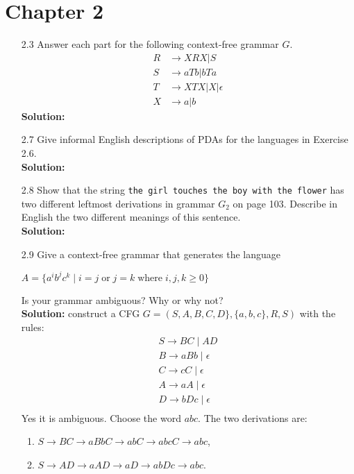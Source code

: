 \chapter*{Chapter 2}

\begin{enumerate}
\item[2.3]Answer each part for the following context-free grammar $G$.
\begin{align*}
R &\rightarrow XRX | S \\
S &\rightarrow aTb | bTa \\
T &\rightarrow XTX | X | \epsilon \\
X &\rightarrow a | b
\end{align*}
\textbf{Solution:} \alreadyanswered

\item[2.7]Give informal English descriptions of PDAs for the languages in Exercise 2.6.
\\
\textbf{Solution:} \alreadyanswered

\item[2.8]Show that the string \verb|the girl touches the boy with the flower| has two different leftmost derivations in grammar $G_2$ on page 103. Describe in English the two different meanings of this sentence.
\\
\textbf{Solution:} \alreadyanswered

\item[2.9]Give a context-free grammar that generates the language
\begin{center}
$A = \{a^ib^jc^k\;\vert\;i=j\;\text{or}\;j=k\;\text{where}\;i,j,k\ge 0\}$
\end{center}
Is your grammar ambiguous? Why or why not?
\\
\textbf{Solution:} construct a CFG $G = (S, A, B, C, D\}, \{a, b, c\}, R, S)$ with the rules:
\begin{align*}
S \rightarrow BC\;\vert\;AD\\
B \rightarrow aBb\;\vert\;\epsilon \\
C \rightarrow cC\;\vert\;\epsilon \\
A \rightarrow aA\;\vert\;\epsilon \\
D \rightarrow bDc\;\vert\;\epsilon \\
\end{align*}
Yes it is ambiguous. Choose the word $abc$. The two derivations are:
\begin{enumerate}
\item $S \rightarrow BC \rightarrow aBbC \rightarrow abC \rightarrow abcC \rightarrow abc$,
\item $S \rightarrow AD \rightarrow aAD \rightarrow aD \rightarrow abDc \rightarrow abc$.
\end{enumerate}


\end{enumerate}
